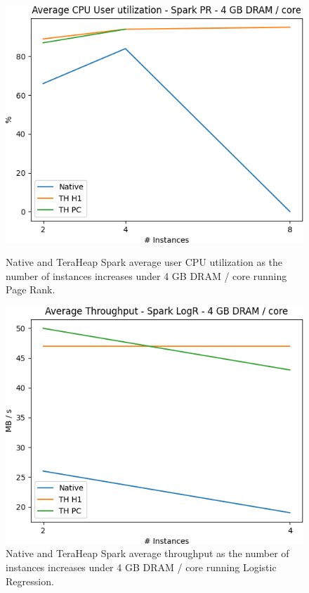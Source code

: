 \begin{figure}[thbp]
	\centering
	\includegraphics[width=\linewidth]{./fig/PR_64_USR.png}
    \caption{Native and TeraHeap Spark average user CPU utilization
        as the number of instances increases under 4 GB DRAM / core running Page Rank.}
		\label{fig:pr_64_usr}

	\centering
        \includegraphics[width=\linewidth]{./fig/LOGR_64_THR.png}
    \caption{Native and TeraHeap Spark average throughput
        as the number of instances increases under 4 GB DRAM / core running Logistic Regression.}
		\label{fig:logr_64_thr}
\end{figure}

